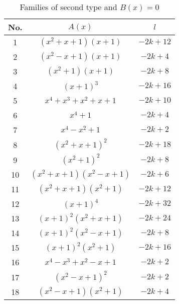 \documentclass{amsart}
\begin{document}
\begin{table}[ht]
\caption{Families of second type and $B(x)=0$}
\centering
\begin{tabular}{|c |c |c |}
\hline
No. & $A(x)$ & $l$ \\
\hline
1 & $(x^2+x+1)(x+1)$ & $-2k+12$ \\
2 & $(x^2-x+1)(x+1)$ & $-2k+4$ \\
3 & $(x^2+1)(x+1)$ & $-2k+8$ \\
4 & $(x+1)^3$ & $-2k+16$ \\
5 & $x^4+x^3+x^2+x+1$ & $-2k+10$ \\
6 & $x^4+1$ & $-2k+4$ \\
7 & $x^4-x^2+1$ & $-2k+2$ \\
8 & $(x^2+x+1)^2$ & $-2k+18$ \\
9 & $(x^2+1)^2$ & $-2k+8$ \\
10 & $(x^2+x+1)(x^2-x+1)$ & $-2k+6$ \\
11 & $(x^2+x+1)(x^2+1)$ & $-2k+12$ \\
12 & $(x+1)^4$ & $-2k+32$ \\
13 & $(x+1)^2(x^2+x+1)$ & $-2k+24$ \\
14 & $(x+1)^2(x^2-x+1)$ & $-2k+8$ \\
15 & $(x+1)^2(x^2+1)$ & $-2k+16$ \\
16 & $x^4-x^3+x^2-x+1$ & $-2k+2$ \\
17 & $(x^2-x+1)^2$ & $-2k+2$ \\
18 & $(x^2-x+1)(x^2+1)$ & $-2k+4$ \\
\hline
\end{tabular}
\end{table}
\end{document}
